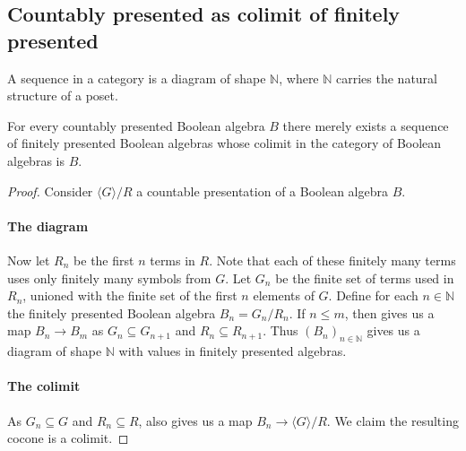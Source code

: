 \documentclass{../util/zariski-small}
\begin{document}
\subsection{Countably presented as colimit of finitely presented}
\begin{definition}
  A sequence in a category is a diagram of shape $\mathbb N$, 
  where $\mathbb N$ carries the natural structure of a poset. 
\end{definition}
\begin{lemma}
  For every countably presented Boolean algebra $B$
  there merely exists a sequence of finitely presented Boolean algebras 
  whose colimit in the category of Boolean algebras is $B$. 
\end{lemma}
\begin{proof}
  Consider $\langle G \rangle /R$ a countable presentation of a Boolean algebra $B$. 
  \paragraph{The diagram}
  Now let $R_n$ be the first $n$ terms in $R$. 
  Note that each of these finitely many terms uses only finitely many symbols from $G$.
  Let $G_n$ be the finite set of terms used in $R_n$, unioned with the finite set of the first $n$ elements of $G$. 
  Define for each $n\in\mathbb N$ the finitely presented Boolean algebra $B_n = G_n /R_n$. 
  If $n\leq m$, then  gives us a map $B_n \to B_m$ 
  as $G_n \subseteq G_{n+1}$ and $R_n \subseteq R_{n+1}$. 
  Thus $(B_n)_{n\in \mathbb N}$ gives us a diagram of shape $\mathbb N$
  with values in finitely presented algebras. 

  \paragraph{The colimit}
  As $G_n\subseteq G$ and $R_n \subseteq R$, 
   also gives us a map $B_n\to \langle G \rangle /R$. 
  We claim the resulting cocone is a colimit. 


\end{proof}
\end{document}
